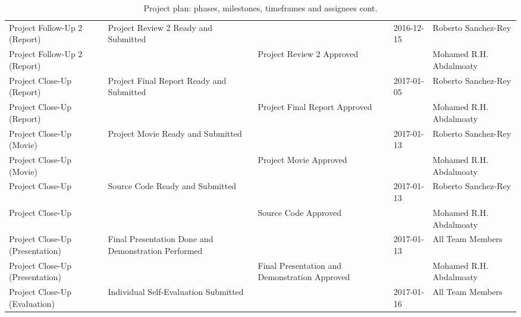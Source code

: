 \begin{landscape}
\begin{table}
    \begin{tabularx}{\linewidth}{l|X|XXX}
    Project Follow-Up 2 (Report)    & Project Review 2 Ready and Submitted                & ~                                             & 2016-12-15 & Roberto Sanchez-Rey                                      \\
    Project Follow-Up 2 (Report)    & ~                                                   & Project Review 2 Approved                     & ~          & Mohamed R.H. Abdalmoaty                                  \\ \hline
    Project Close-Up (Report)       & Project Final Report Ready and Submitted            & ~                                             & 2017-01-05 & Roberto Sanchez-Rey                                      \\
    Project Close-Up (Report)       & ~                                                   & Project Final Report  Approved                & ~          & Mohamed R.H. Abdalmoaty                                  \\
    Project Close-Up (Movie)        & Project Movie Ready and Submitted                   & ~                                             & 2017-01-13 & Roberto Sanchez-Rey                                      \\
    Project Close-Up (Movie)        & ~                                                   & Project Movie Approved                        & ~          & Mohamed R.H. Abdalmoaty                                  \\
    Project Close-Up                & Source Code Ready and Submitted                     & ~                                             & 2017-01-13 & Roberto Sanchez-Rey                                      \\
    Project Close-Up                & ~                                                   & Source Code Approved                          & ~          & Mohamed R.H. Abdalmoaty                                  \\ \hline
    Project Close-Up (Presentation) & Final Presentation Done and Demonstration Performed & ~                                             & 2017-01-13 & All Team Members                                         \\
    Project Close-Up (Presentation) & ~                                                   & Final Presentation and Demonstration Approved & ~          & Mohamed R.H. Abdalmoaty                                  \\ \hline
    Project Close-Up (Evaluation)   & Individual Self-Evaluation Submitted                & ~                                             & 2017-01-16 & All Team Members                                         \\
    \end{tabularx}
    \caption{Project plan: phases, milestones, timeframes and assignees cont.}
    \label{tbl:project_plan_2}
\end{table}
\end{landscape}
